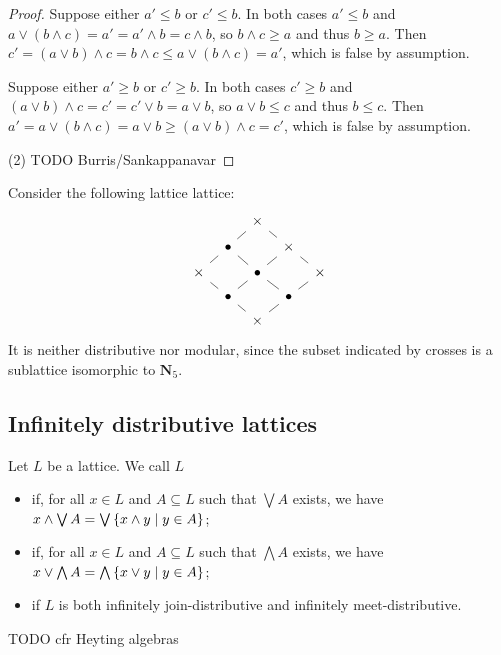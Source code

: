 \begin{proof}
Suppose either $a'\leq b$ or $c'\leq b$. In both cases $a'\leq b$ and $a\vee (b\wedge c) = a' = a'\wedge b = c\wedge b$, so $b\wedge c \geq a$ and thus $b\geq a$. Then $c' = (a\vee b)\wedge c = b\wedge c \leq a\vee(b\wedge c) = a'$, which is false by assumption.

Suppose either $a'\geq b$ or $c'\geq b$. In both cases $c'\geq b$ and $(a\vee b)\wedge c = c' = c'\vee b = a\vee b$, so $a\vee b \leq c$ and thus $b\leq c$. Then $a' = a\vee (b\wedge c) = a\vee b \geq (a\vee b)\wedge c = c'$, which is false by assumption.

(2) TODO Burris/Sankappanavar
\end{proof}

\begin{example}
Consider the following lattice lattice:
\[ \begin{tikzcd}[row sep=tiny, column sep=tiny]
 & & \times \ar[dl, dash] \ar[dr, dash] & & \\
 & \bullet \ar[dl, dash] \ar[dr, dash] && \times \ar[dl, dash] \ar[dr, dash] & \\
\times \ar[dr, dash] & & \bullet \ar[dl, dash] \ar[dr, dash] & & \times \ar[dl, dash] \\
 & \bullet \ar[dr, dash] && \bullet \ar[dl, dash] & \\
 & & \times & & 
\end{tikzcd} \]
It is neither distributive nor modular, since the subset indicated by crosses is a sublattice isomorphic to $\mathbf{N}_5$.
\end{example}

\subsection{Infinitely distributive lattices}
\begin{definition}
Let $L$ be a lattice. We call $L$
\begin{itemize}
\item {} if, for all $x\in L$ and $A\subseteq L$ such that $\bigvee A$ exists, we have $x\wedge \bigvee A = \bigvee\setbuilder{x\wedge y}{y\in A}$;
\item {} if, for all $x\in L$ and $A\subseteq L$ such that $\bigwedge A$ exists, we have $x\vee \bigwedge A = \bigwedge\setbuilder{x\vee y}{y\in A}$;
\item {} if $L$ is both infinitely join-distributive and infinitely meet-distributive.
\end{itemize}
\end{definition}
TODO cfr Heyting algebras

